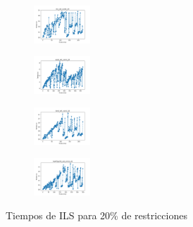 \begin{figure}[H]
\begin{subfigure}
        \centering
        \includegraphics[width=0.234\textwidth]{img/ils/iris_set_const_20_3773969821_time.png}
    \end{subfigure}
    \hfill
    \begin{subfigure}
        \centering
        \includegraphics[width=0.234\textwidth]{img/ils/ecoli_set_const_20_3773969821_time.png}
    \end{subfigure}
    \hfill
    \begin{subfigure}
        \centering
        \includegraphics[width=0.234\textwidth]{img/ils/rand_set_const_20_3773969821_time.png}
    \end{subfigure}
    \hfill
    \begin{subfigure}
        \centering
        \includegraphics[width=0.234\textwidth]{img/ils/newthyroid_set_const_20_3773969821_time.png}
    \end{subfigure}
    \caption{Tiempos de ILS para 20\% de restricciones}
\end{figure}

\vspace*{\fill}
\newpage
\vspace*{\fill}

